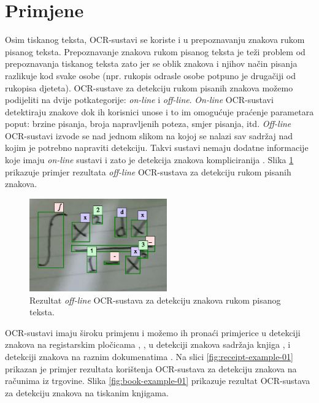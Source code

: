 \documentclass[times, utf8, zavrsni]{fer}
\begin{document}
\section{Primjene}

Osim tiskanog teksta, OCR-sustavi se koriste i u prepoznavanju znakova rukom pisanog teksta.
Prepoznavanje znakova rukom pisanog teksta je teži problem od prepoznavanja tiskanog teksta \citep{DBLP:journals/corr/abs-1710-05703} zato jer
se oblik znakova i njihov način pisanja razlikuje kod svake osobe (npr. rukopis odrasle osobe potpuno je drugačiji od
rukopisa djeteta).
OCR-sustave za detekciju rukom pisanih znakova možemo podijeliti na dvije potkategorije:
\emph{on-line} i \emph{off-line}. \emph{On-line} OCR-sustavi detektiraju znakove dok
ih korisnici unose i to im omogućuje praćenje parametara poput: brzine pisanja, broja napravljenih poteza,
smjer pisanja, itd. \emph{Off-line} OCR-sustavi izvode se nad jednom slikom na kojoj se nalazi
sav sadržaj nad kojim je potrebno napraviti detekciju. Takvi sustavi nemaju dodatne informacije koje imaju
\emph{on-line} sustavi i zato je detekcija znakova kompliciranija \citep{DBLP:journals/corr/abs-1710-05703}. Slika \ref{fig:math-example-01} prikazuje primjer rezultata
\emph{off-line} OCR-sustava za detekciju rukom pisanih znakova.

\begin{figure}[htb]
    \centering
    \captionsetup{justification=centering,margin=2cm}
    \includegraphics[height=4cm]{images/math-example-01.png}
    \caption{Rezultat \emph{off-line} OCR-sustava za detekciju znakova rukom pisanog teksta.}
    \label{fig:math-example-01}
\end{figure}

\pagebreak

OCR-sustavi imaju široku primjenu i možemo ih pronaći primjerice u detekciji
znakova na registarskim pločicama \citep{DBLP:journals/corr/Saghaei16a}, \citep{DBLP:journals/corr/abs-1802-09567},
u detekciji znakova sadržaja knjiga \citep{DBLP:journals/corr/abs-1802-10033},
\citep{Christy:2017:MDE:3172938.3075645} i
detekciji znakova na raznim dokumenatima \citep{DBLP:journals/corr/HarrajR15} \citep{verma2016ocr}. Na slici \ref{fig:receipt-example-01}
prikazan je primjer rezultata korištenja OCR-sustava za detekciju znakova na računima iz trgovine.
Slika \ref{fig:book-example-01} prikazuje rezultat OCR-sustava za detekciju znakova na tiskanim knjigama.
\end{document}
